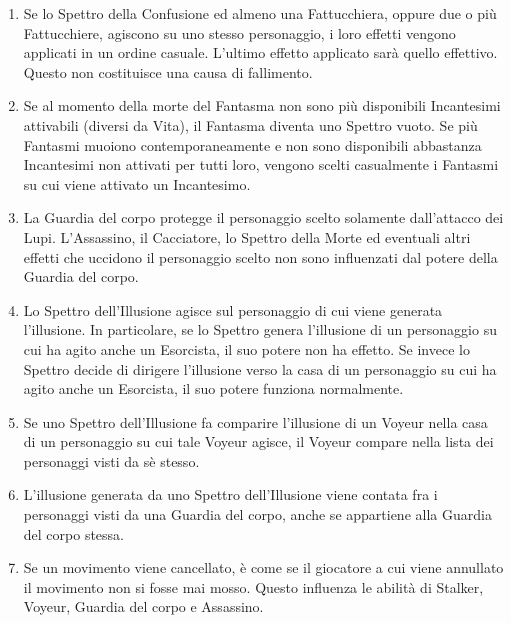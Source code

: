 \documentclass[a4paper,10pt]{article}
\begin{document}
\begin{enumerate}
	\item Se lo Spettro della Confusione ed almeno una Fattucchiera, oppure due o più Fattucchiere, agiscono su uno stesso personaggio, i loro effetti vengono applicati in un ordine casuale. L'ultimo effetto applicato sarà quello effettivo. Questo non costituisce una causa di fallimento.
	
	\item Se al momento della morte del Fantasma non sono più disponibili Incantesimi attivabili (diversi da Vita), il Fantasma diventa uno Spettro vuoto. Se più Fantasmi muoiono contemporaneamente e non sono disponibili abbastanza Incantesimi non attivati per tutti loro, vengono scelti casualmente i Fantasmi su cui viene attivato un Incantesimo.
	
	\item La Guardia del corpo protegge il personaggio scelto solamente dall'attacco dei Lupi. L'Assassino, il Cacciatore, lo Spettro della Morte ed eventuali altri effetti che uccidono il personaggio scelto non sono influenzati dal potere della Guardia del corpo.
	
	\item Lo Spettro dell'Illusione agisce sul personaggio di cui viene generata l'illusione. In particolare, se lo Spettro genera l'illusione di un personaggio su cui ha agito anche un Esorcista, il suo potere non ha effetto. Se invece lo Spettro decide di dirigere l'illusione verso la casa di un personaggio su cui ha agito anche un Esorcista, il suo potere funziona normalmente.
	
	\item Se uno Spettro dell'Illusione fa comparire l'illusione di un Voyeur nella casa di un personaggio su cui tale Voyeur agisce, il Voyeur compare nella lista dei personaggi visti da sè stesso.
	
	\item L'illusione generata da uno Spettro dell'Illusione viene contata fra i personaggi visti da una Guardia del corpo, anche se appartiene alla Guardia del corpo stessa.

	\item Se un movimento viene cancellato, è come se il giocatore a cui viene annullato il movimento non si fosse mai mosso. Questo influenza le abilità di Stalker, Voyeur, Guardia del corpo e Assassino.
	

\end{enumerate}
\end{document}
